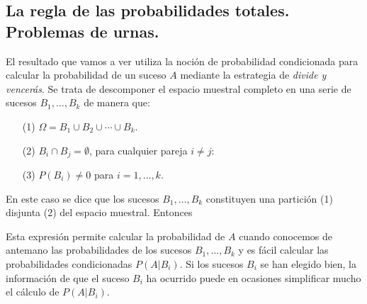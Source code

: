 \subsection{La regla de las probabilidades totales. Problemas de urnas.}
\label{cap03:subsec:ProbabilidadesTotales}


El resultado que vamos a ver utiliza la noción de probabilidad condicionada para calcular la probabilidad de un suceso $A$ mediante la estrategia de {\em divide y vencerás}.  Se trata de descomponer el espacio muestral completo en una serie de sucesos $B_1,\ldots,B_k$ de manera que:
    \begin{enumerate}
        \item[(1)] $\Omega=B_1\cup B_2\cup\cdots\cup B_k.$
        \item[(2)] $B_i\cap B_j=\emptyset$, para cualquier pareja $i\neq j$:
        \item[(3)] $P(B_i)\neq 0$ para $i=1,\ldots,k$.
    \end{enumerate}
{En este caso se dice que los sucesos $B_1,\ldots,B_k$ constituyen una partici\'on (1)
disjunta (2) del espacio muestral. } Entonces
        \begin{center}
        \end{center}
Esta expresión permite calcular la probabilidad de $A$ cuando conocemos de antemano las probabilidades de los sucesos $B_1,\ldots,B_k$ y es fácil calcular las probabilidades condicionadas $P(A|B_i)$. Si los sucesos $B_i$ se han elegido bien, la información de que el suceso $B_i$ ha ocurrido puede en ocasiones simplificar mucho el cálculo de $P(A|B_i)$.

